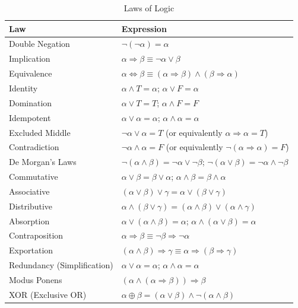 \documentclass[oneside,11pt,dvipsnames]{book}
\renewcommand{\implies}{\Rightarrow}
\begin{document}
\begin{table}
    \caption{Laws of Logic}\label{tab:logic_laws}
    \centering
    \begin{tabular}{lp{10cm}}
    \toprule
    \textbf{Law} & \textbf{Expression} \\ 
    \midrule
    Double Negation & \(\neg (\neg \alpha) = \alpha\) \\     
    Implication & \(\alpha \implies \beta \equiv \neg \alpha \lor \beta\) \\ 
    Equivalence & \(\alpha \iff \beta \equiv (\alpha \implies \beta) \land (\beta \implies \alpha)\) \\ 
    Identity & \(\alpha \land T = \alpha\); \(\alpha \lor F = \alpha\) \\ 
    Domination & \(\alpha \lor T = T\); \(\alpha \land F = F\) \\ 
    Idempotent & \(\alpha \lor \alpha = \alpha\); \(\alpha \land \alpha = \alpha\) \\ 
    Excluded Middle & \( \neg  \alpha \lor\alpha = T\) (or equivalently \(\alpha \implies \alpha = T\))\\
    Contradiction & \( \neg \alpha \land \alpha = F\) (or equivalently \(\neg (\alpha \implies \alpha) = F\))\\    
    De Morgan's Laws & \(\neg (\alpha \land \beta) = \neg \alpha \lor \neg \beta\); \(\neg (\alpha \lor \beta) = \neg \alpha \land \neg \beta\) \\ 
    Commutative & \(\alpha \lor \beta = \beta \lor \alpha\); \(\alpha \land \beta = \beta \land \alpha\) \\ 
    Associative & \((\alpha \lor \beta) \lor \gamma = \alpha \lor (\beta \lor \gamma)\) \\ 
    Distributive & \(\alpha \land (\beta \lor \gamma) = (\alpha \land \beta) \lor (\alpha \land \gamma)\) \\ 
    Absorption & \(\alpha \lor (\alpha \land \beta) = \alpha\); \(\alpha \land (\alpha \lor \beta) = \alpha\) \\ 
    Contraposition & \(\alpha \implies \beta \equiv \neg \beta \implies \neg \alpha\) \\ 
    Exportation & \((\alpha \land \beta) \implies \gamma \equiv \alpha \implies (\beta \implies \gamma)\) \\ 
    Redundancy (Simplification) & \(\alpha \lor \alpha = \alpha\); \(\alpha \land \alpha = \alpha\) \\ 
    Modus Ponens & \((\alpha \land (\alpha \implies \beta)) \implies \beta\) \\
    XOR (Exclusive OR) & \(\alpha \oplus \beta = (\alpha \lor \beta) \land \neg (\alpha \land \beta)\) \\ 
    \bottomrule
    \end{tabular}
\end{table}
    
\end{document}
